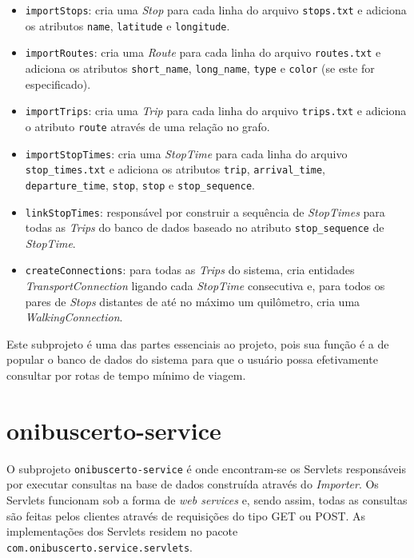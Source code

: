 \begin{itemize}
	\item \texttt{importStops}: cria uma \emph{Stop} para cada linha do arquivo \texttt{stops.txt} e adiciona os atributos \texttt{name}, \texttt{latitude} e 				\texttt{longitude}.
	\item \texttt{importRoutes}: cria uma \emph{Route} para cada linha do arquivo \texttt{routes.txt} e adiciona os atributos \texttt{short\_name}, 						\texttt{long\_name}, \texttt{type} e \texttt{color} (se este for especificado).
	\item \texttt{importTrips}: cria uma \emph{Trip} para cada linha do arquivo \texttt{trips.txt} e adiciona o atributo \texttt{route} através de uma relação no 			grafo.
	\item \texttt{importStopTimes}: cria uma \emph{StopTime} para cada linha do arquivo \texttt{stop\_times.txt} e adiciona os atributos \texttt{trip}, 					\texttt{arrival\_time}, \texttt{departure\_time}, \texttt{stop}, \texttt{stop} e \texttt{stop\_sequence}.
	\item \texttt{linkStopTimes}: responsável por construir a sequência de \emph{StopTimes} para todas as \emph{Trips} do banco de dados baseado no atributo 				\texttt{stop\_sequence} de \emph{StopTime}.
	\item \texttt{createConnections}: para todas as \emph{Trips} do sistema, cria entidades \emph{TransportConnection} ligando cada \emph{StopTime} consecutiva e, 			para todos os pares de \emph{Stops} distantes de até no máximo um quilômetro, cria uma \emph{WalkingConnection}.
\end{itemize}

Este subprojeto é uma das partes essenciais ao projeto, pois sua função é a de popular o banco de dados do sistema para que o usuário possa efetivamente consultar por rotas de tempo mínimo de viagem.

\section{onibuscerto-service}

O subprojeto \texttt{onibuscerto-service} é onde encontram-se os Servlets responsáveis por executar consultas na base de dados construída através do \emph{Importer}.
Os Servlets funcionam sob a forma de \emph{web services} e, sendo assim, todas as consultas são feitas pelos clientes através de requisições  do tipo GET ou POST.
As implementações dos Servlets residem no pacote \texttt{com.onibuscerto.service.servlets}.

